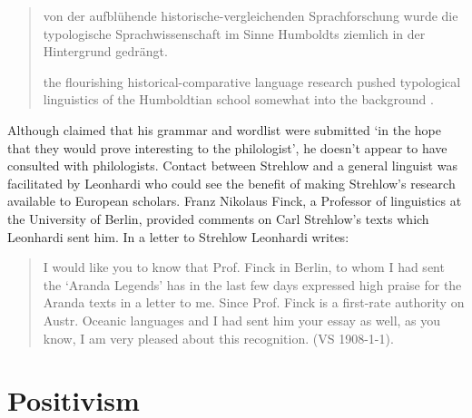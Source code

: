 \documentclass[output=paper]{langsci/langscibook}
\begin{document}
\begin{quote}
    von der aufblühende historische-vergleichenden Sprachforschung wurde die typologische Sprachwissenschaft im Sinne Humboldts ziemlich in der Hintergrund gedrängt. 
    
    the flourishing historical-comparative language research pushed typological linguistics of the Humboldtian school somewhat into the background \citep[216]{deeters_vergleichende_1937}.  
\end{quote}

Although \citet[1]{kempe_grammar_1891} claimed that his grammar and wordlist were submitted ‘in the hope that they would prove interesting to the philologist’, he doesn’t appear to have consulted with philologists. Contact between Strehlow and a general linguist was facilitated by Leonhardi who could see the benefit of making Strehlow’s research available to European scholars. Franz Nikolaus Finck, a Professor of linguistics at the University of Berlin, provided comments on Carl Strehlow’s texts which Leonhardi sent him. In a letter to Strehlow Leonhardi writes: 

\begin{quote}
    I would like you to know that Prof. Finck in Berlin, to whom I had sent the ‘Aranda Legends’ has in the last few days expressed high praise for the Aranda texts in a letter to me. Since Prof. Finck is a first-rate authority on Austr. Oceanic languages and I had sent him your essay as well, as you know, I am very pleased about this recognition.  (VS 1908-1-1).
\end{quote}

\section{Positivism} 
\end{document}
